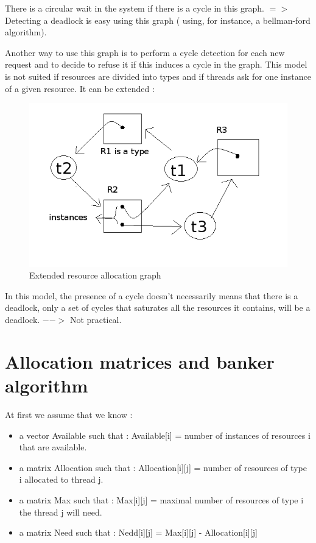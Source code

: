 \documentclass[a4paper,10pt]{article}
\begin{document}
There is a circular wait in the system if there is a cycle in this graph.
$=>$ Detecting a deadlock is easy using this graph ( using, for instance, a bellman-ford algorithm).

Another way to use this graph is to perform a cycle detection for each new request and to decide to refuse it if this induces a cycle in the graph.
This model is not suited if resources are divided into types and if threads ask for one instance of a given resource.
It can be extended :

\begin{figure}[h]
  \begin{center}
    \includegraphics[scale=0.6]{resource_graph_extended}
    \caption{Extended resource allocation graph}
    \label{}
  \end{center}
\end{figure}

In this model, the presence of a cycle doesn't necessarily means that there is a deadlock, only a set of cycles that saturates all the resources it contains, will be a deadlock. $-->$ Not practical.

\section{Allocation matrices and banker algorithm}

At first we assume that we know :

\begin{itemize}
  \item a vector Available such that : Available[i] = number of instances of resources i that are available.
  \item a matrix Allocation such that : Allocation[i][j] = number of resources of type i allocated to thread j.
  \item a matrix Max such that : Max[i][j] = maximal number of resources of type i the thread j will need.
  \item a matrix Need such that : Nedd[i][j] = Max[i][j] - Allocation[i][j]
\end{itemize}
\end{document}
